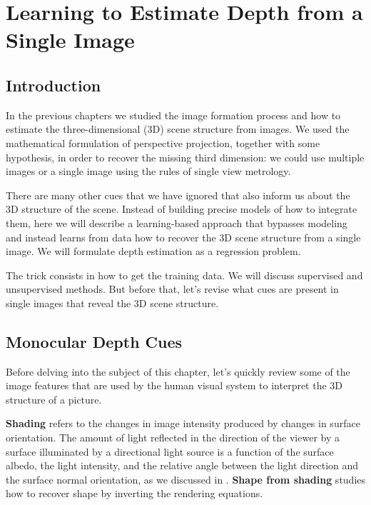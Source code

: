 \chapter{Learning to Estimate Depth from a Single Image}
\label{chapter:3D_learning_from_single_image}

\section{Introduction}

In the previous chapters we studied the image formation process and how to estimate the three-dimensional (3D) scene structure from images. We used the mathematical formulation of perspective projection, together with some hypothesis, in order to recover the missing third dimension: we could use multiple images or a single image using the rules of single view metrology.

There are many other cues that we have ignored that also inform us about the 3D structure of the scene. Instead of building precise models of how to integrate them, here we will describe a learning-based approach that bypasses modeling and instead learns from data how to recover the 3D scene structure from a single image. We will formulate depth estimation as a regression problem.

The trick consists in how to get the training data. We will discuss supervised and unsupervised methods. But before that, let's revise what cues are present in single images that reveal the 3D scene structure.

\section{Monocular Depth Cues}

Before delving into the subject of this chapter, let's quickly review some of the image features that are used by the human visual system to interpret the 3D structure of a picture. 

{\bf Shading} refers to the changes in image intensity produced by changes in surface orientation. The amount of light reflected in the direction of the viewer by a surface illuminated by a directional light source is a function of the surface albedo, the light intensity, and the relative angle between the light direction and the surface normal orientation, as we discussed in \sect{\ref{sec:light_interacting_with_surfaces}}. {\bf Shape from shading} \cite{Barron2015ShapeIA,Freeman90d,Horn89a,Pentland90} studies how to recover shape by inverting the rendering equations.

